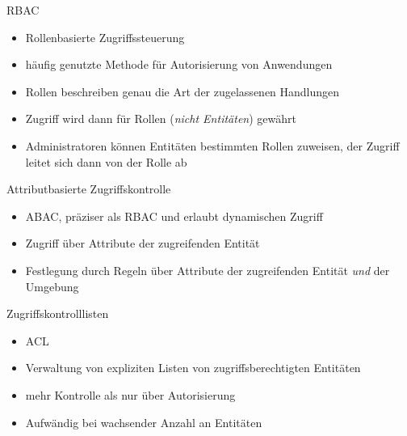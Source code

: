 \begin{flashcard}[Definition]{RBAC}
  \begin{itemize}
    \item Rollenbasierte Zugriffssteuerung
    \item häufig genutzte Methode für Autorisierung von Anwendungen
    \item Rollen beschreiben genau die Art der zugelassenen Handlungen
    \item Zugriff wird dann für Rollen (\emph{nicht Entitäten}) gewährt
    \item Administratoren können Entitäten bestimmten Rollen zuweisen,\newline
      der Zugriff leitet sich dann von der Rolle ab
  \end{itemize}
\end{flashcard}

\begin{flashcard}[Definition]{Attributbasierte Zugriffskontrolle}
  \begin{itemize}
    \item ABAC, präziser als RBAC und erlaubt dynamischen Zugriff
    \item Zugriff über Attribute der zugreifenden Entität
    \item Festlegung durch Regeln über Attribute der zugreifenden Entität \emph{und} der Umgebung
  \end{itemize}
\end{flashcard}

\begin{flashcard}[Definition]{Zugriffskontrolllisten}
  \begin{itemize}
    \item ACL
    \item Verwaltung von expliziten Listen von zugriffsberechtigten Entitäten
    \item mehr Kontrolle als nur über Autorisierung
    \item Aufwändig bei wachsender Anzahl an Entitäten
  \end{itemize}
\end{flashcard}

